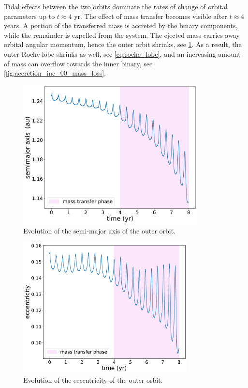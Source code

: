 Tidal effects between the two orbits dominate the rates of change of orbital parameters up to $t \approx 4$ yr. The effect of mass transfer becomes visible after $t \approx 4$ years. A portion of the transferred mass is accreted by the binary components, while the remainder is expelled from the system.  The ejected mass carries away orbital angular momentum, hence the outer orbit shrinks, see \cref{fig:accretion_inc_00_outer_semimajor_axis}. As a result,  the outer Roche lobe shrinks as well, see \cref{eq:roche_lobe}, and an increasing amount of mass can overflow towards the inner binary, see \cref{fig:accretion_inc_00_mass_loss}. 
\begin{figure}[H]
    \centering
    \includegraphics[width=0.85\textwidth]{Thesis/graphs/inc_00/accretion_outer_inc_00_semimajor_axis.pdf}
    \caption{Evolution of the semi-major axis of the outer orbit.}
    \label{fig:accretion_inc_00_outer_semimajor_axis}
\end{figure}
\begin{figure}[H]
    \centering
    \includegraphics[width=0.8\textwidth]{Thesis/graphs/inc_00/accretion_inc_00_outer_ecc.pdf}
    \caption{Evolution of the eccentricity of the outer orbit.}
    \label{fig:accretion_inc_00_outer_ecc}
\end{figure}
